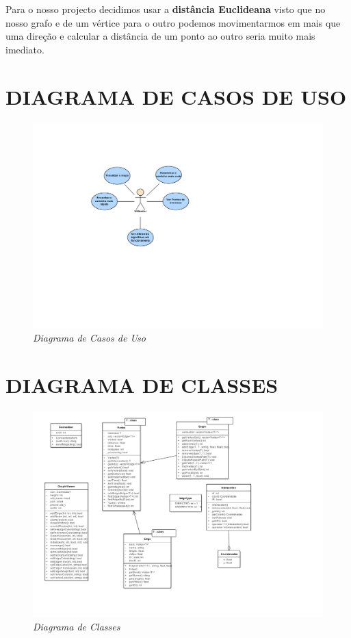 \documentclass[a4paper]{article}
\begin{document}
Para o nosso projecto decidimos usar a \textbf{distância Euclideana} visto que no nosso grafo e de um vértice para o outro podemos movimentarmos em mais que uma direção e calcular a distância de um ponto ao outro seria muito mais imediato.


\section{DIAGRAMA DE CASOS DE USO}

\begin{figure}[H]
\vspace*{-1.5cm}
\hspace*{-2.5cm}   
\includegraphics[scale = 1.0]{DiagramaCasoDeUso.pdf}
\centering
\caption{\textit{Diagrama de Casos de Uso}}
\end{figure}

\section{DIAGRAMA DE CLASSES}

\begin{figure}[H]
\includegraphics[scale = 0.7]{DiagramaDeClassesCAL}
\centering
\caption{\textit{Diagrama de Classes}}
\end{figure}
\end{document}
